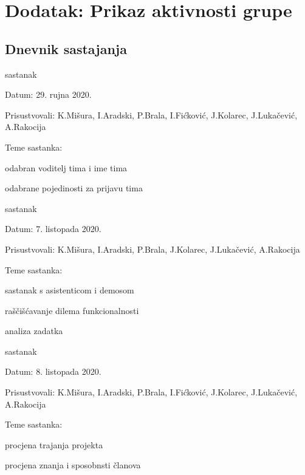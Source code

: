 \chapter*{Dodatak: Prikaz aktivnosti grupe}
		
		\section*{Dnevnik sastajanja}
		
		\begin{packed_enum}
			\item  sastanak
			
			\item[] \begin{packed_item}
				\item Datum: 29. rujna 2020.
				\item Prisustvovali: K.Mišura, I.Aradski, P.Brala, I.Fićković, J.Kolarec, J.Lukačević, A.Rakocija
				\item Teme sastanka:
				\begin{packed_item}
					\item  odabran voditelj tima i ime tima
					\item  odabrane pojedinosti za prijavu tima
				\end{packed_item}
			\end{packed_item}
			
			\item  sastanak
			\item[] \begin{packed_item}
				\item Datum: 7. listopada 2020.
				\item Prisustvovali:  K.Mišura, I.Aradski, P.Brala, J.Kolarec, J.Lukačević, A.Rakocija
				\item Teme sastanka:
				\begin{packed_item}
					\item  sastanak s asistenticom i demosom
					\item  raščišćavanje dilema funkcionalnosti 
					\item analiza zadatka
				\end{packed_item}
			\end{packed_item}
			
			\item sastanak
			\item[] \begin{packed_item}
				\item Datum: 8. listopada 2020.
				\item Prisustvovali:  K.Mišura, I.Aradski, P.Brala, I.Fićković, J.Kolarec, J.Lukačević, A.Rakocija
				\item Teme sastanka:
				\begin{packed_item}
					\item  procjena trajanja projekta
					\item  procjena znanja i sposobnsti članova
				\end{packed_item}
			\end{packed_item}
			

\end{packed_enum}
